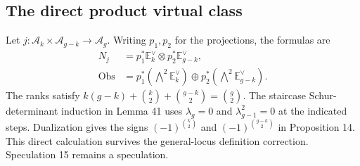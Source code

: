 \documentclass[10pt]{article}
\begin{document}
\subsection*{The direct product virtual class}
Let \(j:\mathcal A_k\times\mathcal A_{g-k}\to\mathcal A_g\). Writing \(p_1,p_2\) for the projections, the formulas are \[\begin{aligned}
 N_j&=p_1^*\mathbb E_k^\vee\otimes p_2^*\mathbb E_{g-k}^\vee,\\
 \operatorname{Obs}
   &=p_1^*(\bigwedge^2\mathbb E_k^\vee)\oplus
                              p_2^*(\bigwedge^2\mathbb E_{g-k}^\vee).\end{aligned}\] The ranks satisfy \(k(g-k)+\binom{k}{2}+\binom{g-k}{2}=\binom g2\). The staircase Schur-determinant induction in Lemma 41 uses \(\lambda_g=0\) and \(\lambda_{g-1}^2=0\) at the indicated steps. Dualization gives the signs \((-1)^{\binom{k}{2}}\) and \((-1)^{\binom{g-k}{2}}\) in Proposition 14. This direct calculation survives the general-locus definition correction. Speculation 15 remains a speculation.\par
\end{document}
